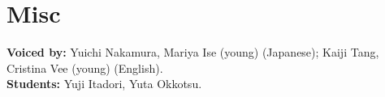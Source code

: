 
\section*{Misc} 
  \resumeSubHeadingListStart
    \small{\item{
        \textbf{Voiced by: }{Yuichi Nakamura, Mariya Ise (young) (Japanese); Kaiji Tang, Cristina Vee (young) (English).} \\[3pt]
        \textbf{Students: }{
        Yuji Itadori, Yuta Okkotsu.
        } \\[3pt]
        
    }}
  \resumeSubHeadingListEnd


